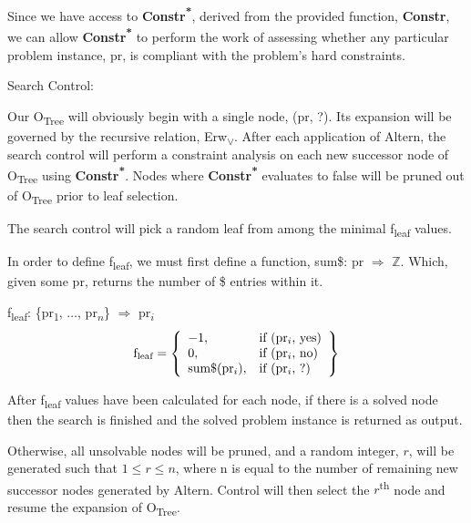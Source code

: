 \documentclass[11pt, oneside]{article}   	%
\newenvironment{cmr}{\fontfamily{cmr}\selectfont}{\par}
\begin{document}
\noindent Since we have access to \textbf{Constr\textsuperscript{*}}, derived from the provided function, \textbf{Constr}, we can allow \textbf{Constr\textsuperscript{*}} to perform the work of assessing whether any particular problem instance, pr, is compliant with the problem's hard constraints.


\begin{cmr}
\noindent Search Control:

\noindent Our O\textsubscript{Tree} will obviously begin with a single node, (pr, ?). Its expansion will be governed by the recursive relation, Erw\textsubscript{$\lor$}.
After each application of Altern, the search control will perform a constraint analysis on each new successor node of O\textsubscript{Tree} using \textbf{Constr\textsuperscript{*}}.
Nodes where \textbf{Constr\textsuperscript{*}} evaluates to false will be pruned out of O\textsubscript{Tree} prior to leaf selection.

\noindent The search control will pick a random leaf from among the minimal f\textsubscript{leaf} values.

\noindent In order to define f\textsubscript{leaf}, we must first define a function, sum\$: pr $\Rightarrow$ $\mathbb{Z}$. Which, given some pr, returns the number of \$ entries within it. 
\end{cmr}

\noindent f\textsubscript{leaf}: \{pr\textsubscript{1}, $\dots$, pr\textsubscript{$n$}\} $\Rightarrow$ pr\textsubscript{$i$}\\
    \[
        \text{f\textsubscript{leaf}} = \left\{\begin{array}{ll}
            -1, & \text{if (pr\textsubscript{$i$}, yes)}\\
            0, & \text{if (pr\textsubscript{$i$}, no)}\\
            \text{sum$\$$(pr\textsubscript{$i$})}, & \text{if (pr\textsubscript{$i$}, ?)}
            \end{array}\right\}
      \]

\begin{cmr}
\noindent After f\textsubscript{leaf} values have been calculated for each node, if there is a solved node then the search is finished and the solved problem instance is returned as output.

\noindent Otherwise, all unsolvable nodes will be pruned, and a random integer, $r$, will be generated such that $1 \le r \le n$, where n is equal to the number of remaining new successor nodes generated by Altern.
Control will then select the $r$\textsuperscript{th} node and resume the expansion of O\textsubscript{Tree}.
\end{cmr}
\end{document}
